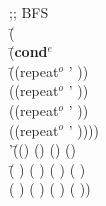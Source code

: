    \begin{ZZZZschemedisplay}%
;; BFS\\%
\va{$\gt$} \=(  \\%
  \>\PRN \HL \=(\textbf{cond$^e$}\\%
  \>  \>\PRN \HL \=((repeat$^o$ ' ))\\%
  \>  \>  \>((repeat$^o$ ' ))\\%
  \>  \>  \>((repeat$^o$ ' ))\\%
  \>  \>  \>((repeat$^o$ ' ))))\\%
'\=(() () () ()\\%
 \>\PRN \=( ) ( ) ( ) ( )\\%
 \> \>(  ) (  ) (  ) (  ))%
\end{ZZZZschemedisplay}
    
